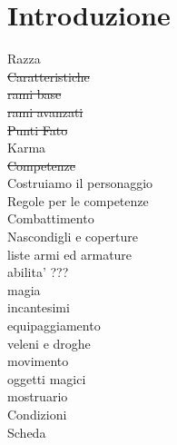 \documentclass[12pt,a4paper,twoside,openany]{book}
\begin{document}







\section{Introduzione}
Razza\\
\sout{Caratteristiche}\\
\sout{rami base}\\
\sout{rami avanzati}\\
\sout{Punti Fato}\\
Karma\\
\sout{Competenze}\\
Costruiamo il personaggio\\
Regole per le competenze\\
Combattimento\\
Nascondigli e coperture\\
liste armi ed armature\\
abilita' ???\\
magia\\
incantesimi\\
equipaggiamento\\
veleni e droghe\\
movimento\\
oggetti magici\\
mostruario\\
Condizioni\\
Scheda\\

\pagebreak
\end{document}
